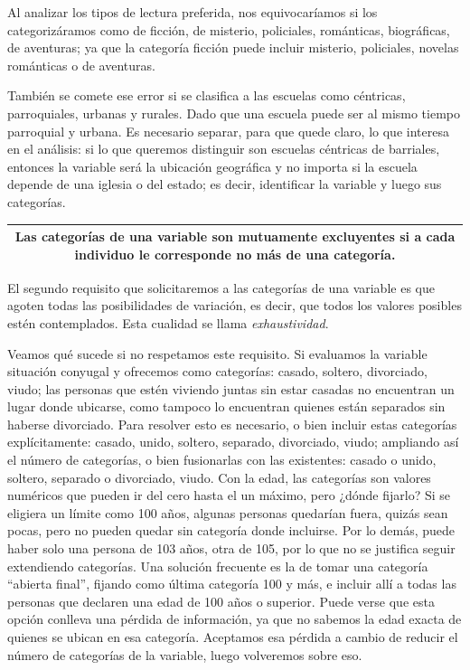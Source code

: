 \documentclass[]{book}
\begin{document}
Al analizar los tipos de lectura preferida, nos equivocaríamos si los categorizáramos como de ficción, de misterio, policiales, románticas, biográficas, de aventuras; ya que la categoría ficción puede incluir misterio, policiales, novelas románticas o de aventuras.

También se comete ese error si se clasifica a las escuelas como céntricas, parroquiales, urbanas y rurales. Dado que una escuela puede ser al mismo tiempo parroquial y urbana. Es necesario separar, para que quede claro, lo que interesa en el análisis: si lo que queremos distinguir son escuelas céntricas de barriales, entonces la variable será la ubicación geográfica y no importa si la escuela depende de una iglesia o del estado; es decir, identificar la variable y luego sus categorías.

\begin{longtable}[]{@{}c@{}}
\toprule
\endhead
\begin{minipage}[t]{0.97\columnwidth}\centering
Las categorías de una variable son \textbf{mutuamente excluyentes} si a cada individuo le corresponde no más de una categoría.\strut
\end{minipage}\tabularnewline
\bottomrule
\end{longtable}

El segundo requisito que solicitaremos a las categorías de una variable es que agoten todas las posibilidades de variación, es decir, que todos los valores posibles estén contemplados. Esta cualidad se llama \emph{exhaustividad}.

Veamos qué sucede si no respetamos este requisito. Si evaluamos la variable situación conyugal y ofrecemos como categorías: casado, soltero, divorciado, viudo; las personas que estén viviendo juntas sin estar casadas no encuentran un lugar donde ubicarse, como tampoco lo encuentran quienes están separados sin haberse divorciado. Para resolver esto es necesario, o bien incluir estas categorías explícitamente: casado, unido, soltero, separado, divorciado, viudo; ampliando así el número de categorías, o bien fusionarlas con las existentes: casado o unido, soltero, separado o divorciado, viudo.
Con la edad, las categorías son valores numéricos que pueden ir del cero hasta el un máximo, pero ¿dónde fijarlo? Si se eligiera un límite como 100 años, algunas personas quedarían fuera, quizás sean pocas, pero no pueden quedar sin categoría donde incluirse. Por lo demás, puede haber solo una persona de 103 años, otra de 105, por lo que no se justifica seguir extendiendo categorías. Una solución frecuente es la de tomar una categoría ``abierta final'', fijando como última categoría 100 y más, e incluir allí a todas las personas que declaren una edad de 100 años o superior. Puede verse que esta opción conlleva una pérdida de información, ya que no sabemos la edad exacta de quienes se ubican en esa categoría. Aceptamos esa pérdida a cambio de reducir el número de categorías de la variable, luego volveremos sobre eso.
\end{document}
